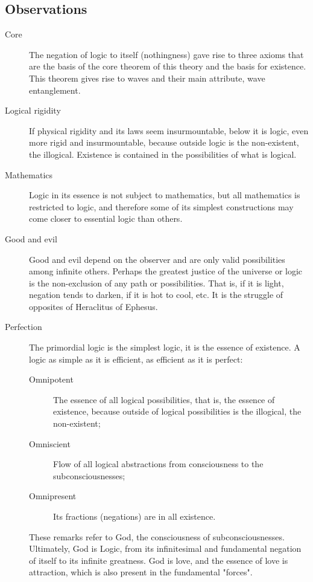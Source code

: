 \subsection{Observations}
	\begin{description}
	   \item[Core] The negation of logic to itself (nothingness) gave rise to three axioms that are the basis of the core theorem of this theory and the basis for existence. This theorem gives rise to waves and their main attribute, wave entanglement.
	   \item[Logical rigidity] If physical rigidity and its laws seem insurmountable, below it is logic, even more rigid and insurmountable, because outside logic is the non-existent, the illogical. Existence is contained in the possibilities of what is logical. 
	   \item[Mathematics] Logic in its essence is not subject to mathematics, but all mathematics is restricted to logic, and therefore some of its simplest constructions may come closer to essential logic than others.
	   \item[Good and evil] Good and evil depend on the observer and are only valid possibilities among infinite others. Perhaps the greatest justice of the universe or logic is the non-exclusion of any path or possibilities. That is, if it is light, negation tends to darken, if it is hot to cool, etc. It is the struggle of opposites of Heraclitus of Ephesus. 
	   \item[Perfection] The primordial logic is the simplest logic, it is the essence of existence. A logic as simple as it is efficient, as efficient as it is perfect:
	   \begin{description}
		   \item[Omnipotent] The essence of all logical possibilities, that is, the essence of existence, because outside of logical possibilities is the illogical, the non-existent;
		   \item[Omniscient] Flow of all logical abstractions from consciousness to the subconsciousnesses; 
		   \item[Omnipresent] Its fractions (negations) are in all existence.
	   \end{description}
	These remarks refer to God, the consciousness of subconsciousnesses. Ultimately, God is Logic, from its infinitesimal and fundamental negation of itself to its infinite greatness. God is love, and the essence of love is attraction, which is also present in the fundamental "forces".

\end{description}
